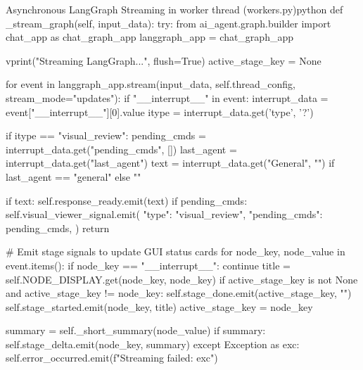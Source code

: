 \begin{thesiscode}{Asynchronous LangGraph Streaming in worker thread (workers.py)\label{lst:worker_stream}}{python}
def _stream_graph(self, input_data):
    try:
        from ai_agent.graph.builder import chat_app as chat_graph_app
        langgraph_app = chat_graph_app

        vprint("\n[GRAPH] Streaming LangGraph...", flush=True)
        active_stage_key = None

        for event in langgraph_app.stream(input_data, self.thread_config, stream_mode="updates"):
            if "__interrupt__" in event:
                interrupt_data = event["__interrupt__"][0].value
                itype = interrupt_data.get('type', '?')
                
                if itype == "visual_review":
                    pending_cmds = interrupt_data.get("pending_cmds", [])
                    last_agent = interrupt_data.get("last_agent")
                    text = interrupt_data.get("General", "") if last_agent == "general" else ""
                    
                    if text:
                        self.response_ready.emit(text)
                    if pending_cmds:
                        self.visual_viewer_signal.emit({
                            "type": "visual_review",
                            "pending_cmds": pending_cmds,
                        })
                    return

            # Emit stage signals to update GUI status cards
            for node_key, node_value in event.items():
                if node_key == "__interrupt__":
                    continue
                title = self.NODE_DISPLAY.get(node_key, node_key)
                if active_stage_key is not None and active_stage_key != node_key:
                    self.stage_done.emit(active_stage_key, "")
                self.stage_started.emit(node_key, title)
                active_stage_key = node_key

                summary = self._short_summary(node_value)
                if summary:
                    self.stage_delta.emit(node_key, summary)
    except Exception as exc:
        self.error_occurred.emit(f"Streaming failed: {exc}")
\end{thesiscode}

